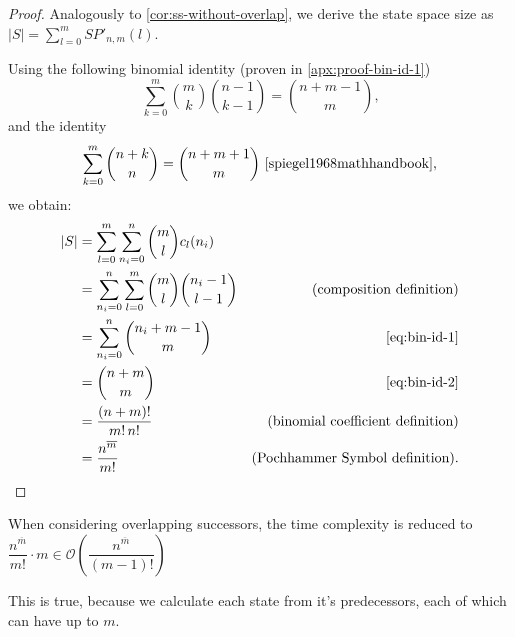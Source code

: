 \begin{proof}
    Analogously to \autoref{cor:ss-without-overlap}, we derive the state space size as $|S| = \sum_{l=0}^m SP'_{n,m}(l)$.

    Using the following binomial identity (proven in \ref{apx:proof-bin-id-1})
    \begin{equation}
        \label{eq:bin-id-1}
        \sum_{k=0}^m \binom{m}{k} \binom{n - 1}{k - 1} = \binom{n + m - 1}{m}\text{,}
    \end{equation}
    and the identity
    \begin{equation}
        \label{eq:bin-id-2}
        \sum_{k=0}^m \binom{n + k}{n} = \binom{n + m + 1}{m}~\cite{spiegel1968mathhandbook}\text{,}
    \end{equation}
    we obtain:
    \begin{align*}
        |S|
        &= \sum_{l=0}^m \sum_{n_i=0}^{n} \binom{m}{l} c_l(n_i) \\
        &= \sum_{n_i=0}^{n} \sum_{l=0}^m \binom{m}{l} \binom{n_i - 1}{l - 1}  & \text{(composition definition)} \\
        &= \sum_{n_i=0}^{n} \binom{n_i + m - 1}{m} & \text{\eqref{eq:bin-id-1}} \\
        &= \binom{n + m}{m} & \text{\eqref{eq:bin-id-2}} \\
        &= \frac{(n + m)!}{m! \, n!} & \text{(binomial coefficient definition)} \\
        &= \frac{n^{\overline m}}{m!} & \text{(Pochhammer Symbol definition)} \text{.}
    \end{align*}
\end{proof}

\begin{corollary}
    When considering overlapping successors, the time complexity is reduced to $\dfrac{n^{\overline m}}{m!} \cdot m \in \mathcal{O} \left( \dfrac{n^{\overline m}}{(m-1)!} \right)$
\end{corollary}

This is true, because we calculate each state from it's predecessors, each of which can have up to $m$.

